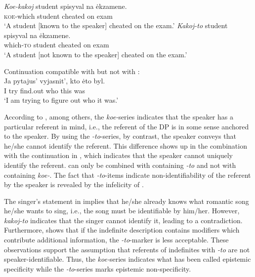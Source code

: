\documentclass[output=paper,colorlinks,citecolor=brown]{langscibook}
\begin{document}
\ea\label{geist:ex:koe-to}
\ea\label{geist:ex:koe-to-a}
\gll \textit{Koe-kakoj} student spisyval na ėkzamene.\\
\textsc{koe}-which student cheated on exam\\
\glt `A student [known to the speaker] cheated on the exam.'
\ex\label{geist:ex:koe-to-b}
\gll \textit{Kakoj-to} student spisyval na ėkzamene.\\
which-\textsc{to} student cheated on exam\\
\glt `A student [not known to the speaker] cheated on the exam.'\\\hfill\citep[156]{Geist2008}
\z\z

\ea Continuation compatible with  but not with :\label{geist:ex:koe-to-cont}\\
\gll Ja pytajus’ vyjasnit’, kto ėto byl.\\
I try find.out who this was\\
\glt ‘I am trying to figure out who it was.’
\z

\noindent According to \citet[45]{Haspelmath1997}, among others, the \textit{koe-}series indicates that the speaker has a particular referent in mind, i.e., the referent of the DP is in some sense anchored to the speaker. By using the \textit{-to}-series, by contrast, the speaker conveys that he/she cannot identify the referent. This difference shows up in the combination with the continuation in , which indicates that the speaker cannot uniquely identify the referent.  can only be combined with  containing \textit{-to} and not with  containing \textit{koe-}. The fact that \textit{-to}-items indicate non-identifiability of the referent by the speaker is revealed by the infelicity of .

\largerpage[2]
\z

\noindent The singer’s statement in  implies that he/she already knows what romantic song he/she wants to sing, i.e., the song must be identifiable by him/her. However, \textit{kakoj-to} indicates that the singer cannot identify it, leading to a contradiction. Furthermore, \citet{Kagan2011} shows that if the indefinite description contains modifiers which contribute additional information, the \textit{-to}-marker is less acceptable. These observations support the assumption that referents of indefinites with \textit{-to} are not speaker-identifiable. Thus, the \textit{koe-}series indicates what has been called epistemic specificity while the \textit{-to}-series marks epistemic non-specificity.
\end{document}
